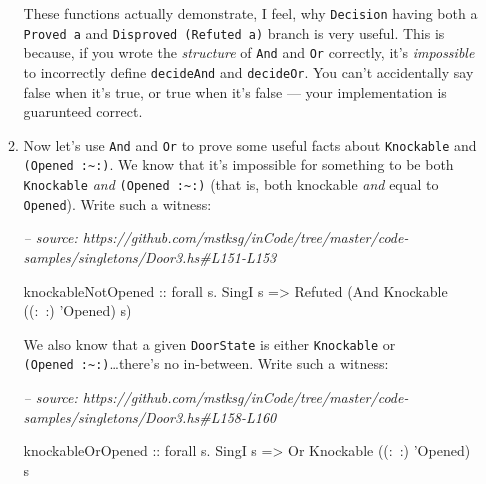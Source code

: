 \documentclass[]{article}
\newenvironment{Shaded}{}{}
\newcommand{\CommentTok}[1]{\textcolor[rgb]{0.38,0.63,0.69}{\textit{#1}}}
\newcommand{\DataTypeTok}[1]{\textcolor[rgb]{0.56,0.13,0.00}{#1}}
\newcommand{\FunctionTok}[1]{\textcolor[rgb]{0.02,0.16,0.49}{#1}}
\newcommand{\NormalTok}[1]{#1}
\newcommand{\OtherTok}[1]{\textcolor[rgb]{0.00,0.44,0.13}{#1}}
\begin{document}
\begin{enumerate}
\begin{enumerate}
    These functions actually demonstrate, I feel, why \texttt{Decision} having
    both a \texttt{Proved\ a} and \texttt{Disproved\ (Refuted\ a)} branch is
    very useful. This is because, if you wrote the \emph{structure} of
    \texttt{And} and \texttt{Or} correctly, it's \emph{impossible} to
    incorrectly define \texttt{decideAnd} and \texttt{decideOr}. You can't
    accidentally say false when it's true, or true when it's false --- your
    implementation is guarunteed correct.
  \item
    Now let's use \texttt{And} and \texttt{Or} to prove some useful facts about
    \texttt{Knockable} and
    \texttt{(\textquotesingle{}Opened\ :\textasciitilde{}:)}. We know that it's
    impossible for something to be both \texttt{Knockable} \emph{and}
    \texttt{(\textquotesingle{}Opened\ :\textasciitilde{}:)} (that is, both
    knockable \emph{and} equal to \texttt{\textquotesingle{}Opened}). Write such
    a witness:

\begin{Shaded}
\begin{Highlighting}[]
\CommentTok{-- source: https://github.com/mstksg/inCode/tree/master/code-samples/singletons/Door3.hs#L151-L153}

\NormalTok{knockableNotOpened}
\OtherTok{    ::}\NormalTok{ forall s}\FunctionTok{.} \DataTypeTok{SingI}\NormalTok{ s}
    \OtherTok{=>} \DataTypeTok{Refuted}\NormalTok{ (}\DataTypeTok{And} \DataTypeTok{Knockable}\NormalTok{ ((}\FunctionTok{:~:}\NormalTok{) '}\DataTypeTok{Opened}\NormalTok{) s)}
\end{Highlighting}
\end{Shaded}

    We also know that a given \texttt{DoorState} is either \texttt{Knockable} or
    \texttt{(\textquotesingle{}Opened\ :\textasciitilde{}:)}\ldots{}there's no
    in-between. Write such a witness:

\begin{Shaded}
\begin{Highlighting}[]
\CommentTok{-- source: https://github.com/mstksg/inCode/tree/master/code-samples/singletons/Door3.hs#L158-L160}

\NormalTok{knockableOrOpened}
\OtherTok{    ::}\NormalTok{ forall s}\FunctionTok{.} \DataTypeTok{SingI}\NormalTok{ s}
    \OtherTok{=>} \DataTypeTok{Or} \DataTypeTok{Knockable}\NormalTok{ ((}\FunctionTok{:~:}\NormalTok{) '}\DataTypeTok{Opened}\NormalTok{) s}
\end{Highlighting}
\end{Shaded}
  \end{enumerate}


\end{enumerate}
\end{document}
